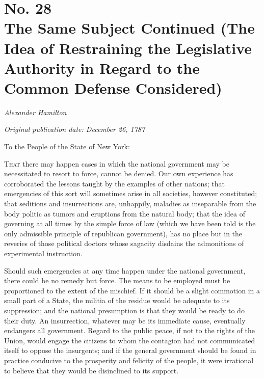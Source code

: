 \chapter[No. 28: The Same Subject Continued (The Idea of Restraining the Legislative Authority in Regard to the Common Defense Considered)]{No. 28\\ {\small The Same Subject Continued (The Idea of Restraining the Legislative Authority in Regard to the Common Defense Considered)}}

\textit{Alexander Hamilton}

\textit{Original publication date: December 26, 1787}
\vspace{1cm}

To the People of the State of New York:
\vspace{.4cm}

\textsc{That} there may happen cases in which the national government may be necessitated to resort to force, cannot be denied. 
Our own experience has corroborated the lessons taught by the examples of other nations; that emergencies of this sort will sometimes arise in all societies, however constituted; that seditions and insurrections are, unhappily, maladies as inseparable from the body politic as tumors and eruptions from the natural body; that the idea of governing at all times by the simple force of law (which we have been told is the only admissible principle of republican government), has no place but in the reveries of those political doctors whose sagacity disdains the admonitions of experimental instruction.

Should such emergencies at any time happen under the national government, there could be no remedy but force. 
The means to be employed must be proportioned to the extent of the mischief. 
If it should be a slight commotion in a small part of a State, the militia of the residue would be adequate to its suppression; and the national presumption is that they would be ready to do their duty. 
An insurrection, whatever may be its immediate cause, eventually endangers all government. 
Regard to the public peace, if not to the rights of the Union, would engage the citizens to whom the contagion had not communicated itself to oppose the insurgents; and if the general government should be found in practice conducive to the prosperity and felicity of the people, it were irrational to believe that they would be disinclined to its support.

